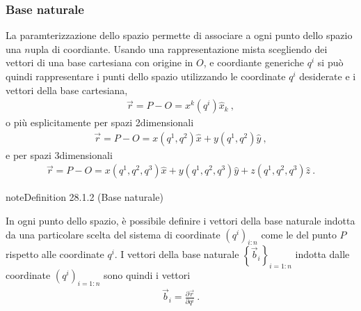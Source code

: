 \documentclass[letterpaper,10pt,italian]{jupyterBook}
\begin{document}
\subsubsection{Base naturale}
\label{\detokenize{ch/vector-calculus/geometry:base-naturale}}\label{\detokenize{ch/vector-calculus/geometry:vector-calculus-geometry-natural-basis}}
\sphinxAtStartPar
La paramterizzazione dello spazio permette di associare a ogni punto dello spazio una \(n\)\sphinxhyphen{}upla di coordiante. Usando una rappresentazione mista \sphinxhyphen{} scegliendo dei vettori di una base cartesiana con origine in \(O\), e coordiante generiche \(q^i\) \sphinxhyphen{} si può quindi rappresentare i punti dello spazio utilizzando le coordinate \(q^i\) desiderate e i vettori della base cartesiana,
\begin{equation*}
\begin{split}\vec{r} = P - O = x^k \left(q^i\right) \hat{x}_k \ ,\end{split}
\end{equation*}
\sphinxAtStartPar
o più esplicitamente per spazi 2\sphinxhyphen{}dimensionali
\begin{equation*}
\begin{split}\vec{r} = P - O = x \left(q^1, q^2\right) \hat{x} + y\left(q^1, q^2\right) \hat{y} \ ,\end{split}
\end{equation*}
\sphinxAtStartPar
e per spazi 3\sphinxhyphen{}dimensionali
\begin{equation*}
\begin{split}\vec{r} = P - O = x \left(q^1, q^2, q^3\right) \hat{x} + y\left(q^1, q^2, q^3 \right) \hat{y} + z\left( q^1, q^2, q^3 \right) \hat{z} \ .\end{split}
\end{equation*}\label{ch/vector-calculus/geometry:definition-6}
\begin{sphinxadmonition}{note}{Definition 28.1.2 (Base naturale)}



\sphinxAtStartPar
In ogni punto dello spazio, è possibile definire i vettori della base naturale indotta da una particolare scelta del sistema di coordinate \(\left( q^i \right)_{i:n}\) come le {\hyperref[\detokenize{ch/multivariable-calculus/derivatives:multivariable-calculus-derivatives-partial}]{}} del punto \(P\) rispetto alle coordinate \(q^i\). I vettori della base naturale \(\left\{\vec{b}_i \right\}_{i=1:n}\) indotta dalle coordinate \(\left( q^i \right)_{i=1:n}\) sono quindi i vettori
\begin{equation*}
\begin{split}\vec{b}_i = \frac{\partial \vec{r}}{\partial q^i} \ .\end{split}
\end{equation*}\end{sphinxadmonition}
\end{document}
